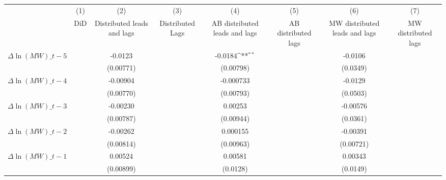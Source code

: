 {
\def\sym#1{\ifmmode^{#1}\else\(^{#1}\)\fi}
\begin{tabular}{l*{7}{c}}
\hline\hline
          &\multicolumn{1}{c}{(1)}&\multicolumn{1}{c}{(2)}&\multicolumn{1}{c}{(3)}&\multicolumn{1}{c}{(4)}&\multicolumn{1}{c}{(5)}&\multicolumn{1}{c}{(6)}&\multicolumn{1}{c}{(7)}\\
          &\multicolumn{1}{c}{DiD}&\multicolumn{1}{c}{Distributed leads and lags}&\multicolumn{1}{c}{Distributed Lags}&\multicolumn{1}{c}{AB distributed leads and lags}&\multicolumn{1}{c}{AB distributed lags}&\multicolumn{1}{c}{MW distributed leads and lags}&\multicolumn{1}{c}{MW distributed lags}\\
\hline
$\Delta \ln(MW)\_{t-5}$&                  &  -0.0123         &                  &  -0.0184\sym{**} &                  &  -0.0106         &                  \\
          &                  &(0.00771)         &                  &(0.00798)         &                  & (0.0349)         &                  \\
[1em]
$\Delta \ln(MW)\_{t-4}$&                  & -0.00904         &                  &-0.000733         &                  &  -0.0129         &                  \\
          &                  &(0.00770)         &                  &(0.00793)         &                  & (0.0503)         &                  \\
[1em]
$\Delta \ln(MW)\_{t-3}$&                  & -0.00230         &                  &  0.00253         &                  & -0.00576         &                  \\
          &                  &(0.00787)         &                  &(0.00944)         &                  & (0.0361)         &                  \\
[1em]
$\Delta \ln(MW)\_{t-2}$&                  & -0.00262         &                  & 0.000155         &                  & -0.00391         &                  \\
          &                  &(0.00814)         &                  &(0.00963)         &                  &(0.00721)         &                  \\
[1em]
$\Delta \ln(MW)\_{t-1}$&                  &  0.00524         &                  &  0.00581         &                  &  0.00343         &                  \\
          &                  &(0.00899)         &                  & (0.0128)         &                  & (0.0149)         &                  \\

\end{tabular}}
